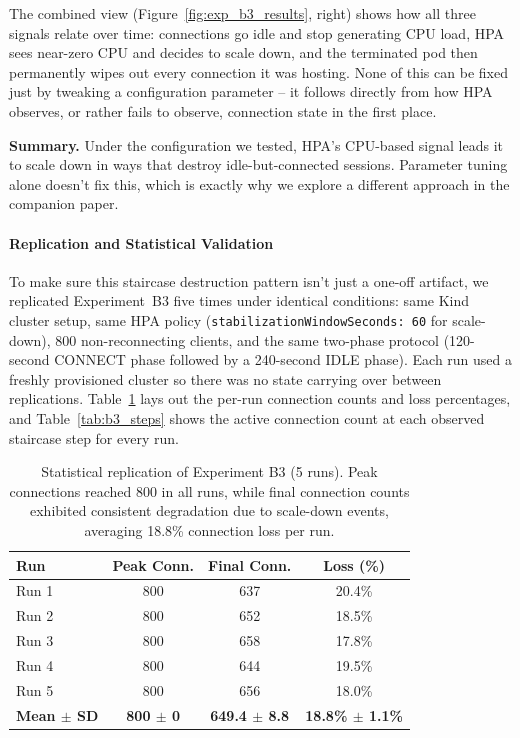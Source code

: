 \documentclass[twocolumn]{svjour3}
\begin{document}
The combined view (Figure~\ref{fig:exp_b3_results}, right) shows how all three
signals relate over time: connections go idle and stop generating CPU load, HPA
sees near-zero CPU and decides to scale down, and the terminated pod then
permanently wipes out every connection it was hosting. None of this can be fixed
just by tweaking a configuration parameter -- it follows directly from how HPA
observes, or rather fails to observe, connection state in the first place.

\noindent\textbf{Summary.} Under the configuration we tested, HPA's CPU-based
signal leads it to scale down in ways that destroy idle-but-connected sessions.
Parameter tuning alone doesn't fix this, which is exactly why we explore a
different approach in the companion paper.

\paragraph{Replication and Statistical Validation}
To make sure this staircase destruction pattern isn't just a one-off artifact, we
replicated Experiment~B3 five times under identical conditions: same Kind cluster
setup, same HPA policy (\texttt{stabilizationWindowSeconds: 60} for scale-down),
800 non-reconnecting clients, and the same two-phase protocol (120-second CONNECT
phase followed by a 240-second IDLE phase). Each run used a freshly provisioned
cluster so there was no state carrying over between replications.
Table~\ref{tab:b3_replication} lays out the per-run connection counts and loss
percentages, and Table~\ref{tab:b3_steps} shows the active connection count at
each observed staircase step for every run.

\begin{table}[ht]
\centering
\caption{Statistical replication of Experiment B3 (5 runs). Peak connections reached
800 in all runs, while final connection counts exhibited consistent degradation due to
scale-down events, averaging 18.8\% connection loss per run.}
\label{tab:b3_replication}
\begin{tabular}{@{}lccc@{}}
\toprule
\textbf{Run} & \textbf{Peak Conn.} & \textbf{Final Conn.} & \textbf{Loss (\%)} \\
\midrule
Run 1 & 800 & 637 & 20.4\% \\
Run 2 & 800 & 652 & 18.5\% \\
Run 3 & 800 & 658 & 17.8\% \\
Run 4 & 800 & 644 & 19.5\% \\
Run 5 & 800 & 656 & 18.0\% \\
\midrule
\textbf{Mean $\pm$ SD} & \textbf{800 $\pm$ 0} & \textbf{649.4 $\pm$ 8.8} & \textbf{18.8\% $\pm$ 1.1\%} \\
\bottomrule
\end{tabular}
\end{table}
\end{document}
